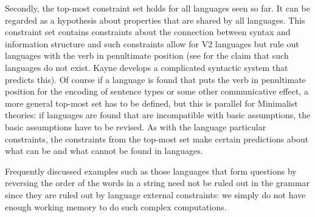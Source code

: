 Secondly, the top-most constraint set holds for all languages seen so far. It can be regarded as a
hypothesis about properties that are shared by all languages. This constraint set contains
constraints about the connection between syntax and information structure and such constraints allow
for V2 languages but rule out languages with the verb in penultimate position (see  for the claim that such languages do not exist. Kayne develops a complicated
syntactic system that predicts this). Of course if a language is found that puts the verb in penultimate
position for the encoding of sentence types or some other communicative effect, a more
general top-most set has to be defined, but this is parallel for Minimalist theories: if languages
are found that are incompatible with basic assumptions, the basic assumptions have to be revised. As
with the language particular constraints, the constraints from the top-most set make certain
predictions about what can be and what cannot be found in languages.

Frequently discussed examples such as those languages that form questions by reversing the order of the words in a
string \citep{MMGRRBW2003a} need not be ruled out in the grammar since they are ruled out by
language external constraints: we simply do not have enough working memory to do such complex computations.

